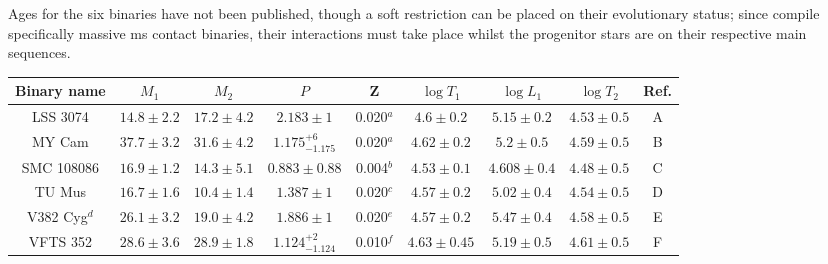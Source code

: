 Ages for the six binaries have not been published, though a soft restriction can be placed on their evolutionary status; since \citet{Abdul-masih:2022} compile specifically massive \gls{ms} contact binaries, their interactions must take place whilst the progenitor stars are on their respective main sequences. %

\begin{table}
    \centering
    \begin{tabular}{c|c|c|c|c|c|c|c|c}
        \toprule
        Binary name & $M_1$ & $M_2$ & $P$ & Z & $\log T_1$ & $\log L_1$ & $\log T_2$ & Ref. \\
        \midrule
        LSS 3074       & $14.8 \pm 2.2$ & $17.2 \pm 4.2$ & $2.183 \pm 1$         & 0.020$^a$ & $4.6 \pm 0.2$    & $5.15 \pm 0.2$   & $4.53 \pm 0.5$   & A \\
        MY Cam         & $37.7 \pm 3.2$ & $31.6 \pm 4.2$ & $1.175^{+6}_{-1.175}$ & 0.020$^a$ & $4.62 \pm 0.2$   & $5.2 \pm 0.5$    & $4.59 \pm 0.5$   & B \\
        SMC 108086     & $16.9 \pm 1.2$ & $14.3 \pm 5.1$ & $0.883 \pm 0.88$      & 0.004$^b$ & $4.53 \pm 0.1$   & $4.608 \pm 0.4$  & $4.48 \pm 0.5$   & C \\
        TU Mus         & $16.7 \pm 1.6$ & $10.4 \pm 1.4$ & $1.387 \pm 1$         & 0.020$^c$ & $4.57 \pm 0.2$   & $5.02 \pm 0.4$   & $4.54 \pm 0.5$   & D \\
        V382 Cyg$^d$   & $26.1 \pm 3.2$ & $19.0 \pm 4.2$ & $1.886 \pm 1$         & 0.020$^e$ & $4.57 \pm 0.2$   & $5.47 \pm 0.4$   & $4.58 \pm 0.5$   & E \\
        VFTS 352       & $28.6 \pm 3.6$ & $28.9 \pm 1.8$ & $1.124^{+2}_{-1.124}$ & 0.010$^f$ & $4.63 \pm 0.45$  & $5.19 \pm 0.5$   & $4.61 \pm 0.5$   & F \\


\end{tabular}
\end{table}
